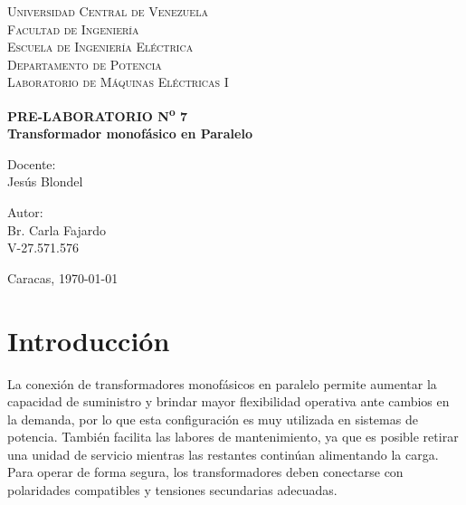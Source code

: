 \documentclass[12pt]{article}
\begin{document}
\thispagestyle{empty}

\begin{center}
    \textsc{Universidad Central de Venezuela}\\[0.35cm]
    \textsc{Facultad de Ingenier\'ia}\\[0.35cm]
    \textsc{Escuela de Ingenier\'ia El\'ectrica}\\[0.35cm]
    \textsc{Departamento de Potencia}\\[0.35cm]
    \textsc{Laboratorio de M\'aquinas El\'ectricas I}
\end{center}

\vspace{6.8cm}

\begin{center}
    \textbf{PRE-LABORATORIO N\textsuperscript{o} 7}\\[0.35cm]
    \textbf{Transformador monof\'asico en Paralelo}
\end{center}

\vfill

\noindent
\begin{minipage}[t]{0.48\textwidth}
    Docente:\\[0.25cm]
    Jes\'us Blondel
\end{minipage}%
\hfill
\begin{minipage}[t]{0.48\textwidth}
    \raggedleft
    Autor:\\[0.25cm]
    Br. Carla Fajardo\\[0.25cm]
    V-27.571.576
\end{minipage}

\vspace{1.1cm}

\begin{center}
    Caracas, \today
\end{center}

\newpage

\section{Introducci\'on}

La conexi\'on de transformadores monof\'asicos en paralelo permite aumentar la capacidad de suministro y brindar mayor flexibilidad operativa ante cambios en la demanda, por lo que esta configuraci\'on es muy utilizada en sistemas de potencia. Tambi\'en facilita las labores de mantenimiento, ya que es posible retirar una unidad de servicio mientras las restantes contin\'uan alimentando la carga. Para operar de forma segura, los transformadores deben conectarse con polaridades compatibles y tensiones secundarias adecuadas.
\end{document}
